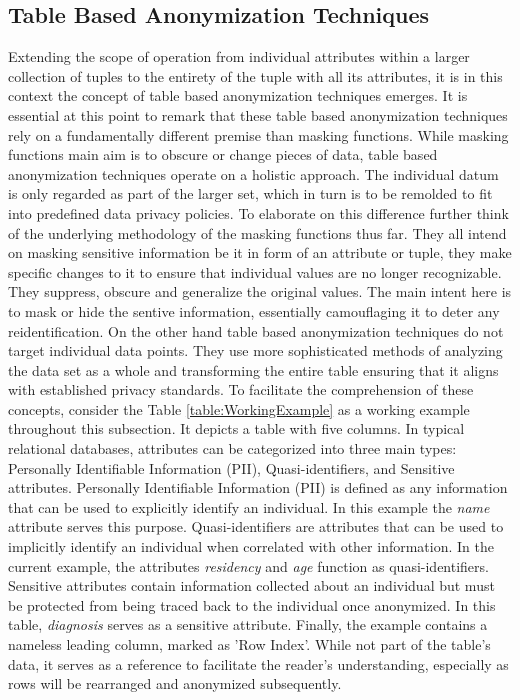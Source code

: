 \subsection{Table Based Anonymization Techniques}
Extending the scope of operation from individual attributes within a larger collection of tuples to the entirety of the tuple with all its attributes, it is in this context the concept of table based anonymization techniques emerges. It is essential at this point to remark that these table based anonymization techniques rely on a fundamentally different premise than masking functions. While masking functions main aim is to obscure or change pieces of data, table based anonymization techniques operate on a holistic approach. The individual datum is only regarded as part of the larger set, which in turn is to be remolded to fit into predefined data privacy policies. To elaborate on this difference further think of the underlying methodology of the masking functions thus far. They all intend on masking sensitive information be it in form of an attribute or tuple, they make specific changes to it to ensure that individual values are no longer recognizable. They suppress, obscure and generalize the original values. The main intent here is to mask or hide the sentive information, essentially camouflaging it to deter any reidentification. On the other hand table based anonymization techniques do not target individual data points. They use more sophisticated methods of analyzing the data set as a whole and transforming the entire table ensuring that it aligns with established privacy standards. To facilitate the comprehension of these concepts, consider the Table \ref{table:WorkingExample} as a working example throughout this subsection. It depicts a table with five columns. In typical relational databases, attributes can be categorized into three main types: Personally Identifiable Information (PII), Quasi-identifiers, and Sensitive attributes. Personally Identifiable Information (PII) is defined as any information that can be used to explicitly identify an individual. In this example the \textit{name} attribute serves this purpose. Quasi-identifiers are attributes that can be used to implicitly identify an individual when correlated with other information. In the current example, the attributes \textit{residency} and \textit{age} function as quasi-identifiers. Sensitive attributes contain information collected about an individual but must be protected from being traced back to the individual once anonymized. In this table, \textit{diagnosis} serves as a sensitive attribute. Finally, the example contains a nameless leading column, marked as 'Row Index'. While not part of the table's data, it serves as a reference to facilitate the reader's understanding, especially as rows will be rearranged and anonymized subsequently.
 
